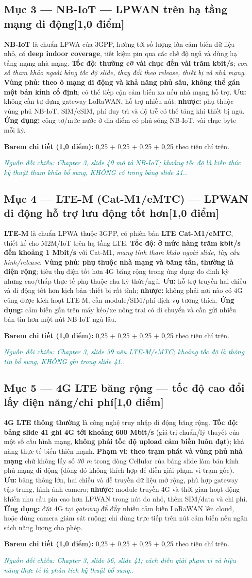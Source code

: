 \documentclass[11pt,a4paper]{article}
\newcommand{\pointpart}[2]{\subsection*{Mục #1 --- #2\hfill\normalsize\color{teal}[1,0 điểm]}}
\newcommand{\src}[1]{\par\noindent\textcolor{teal}{\footnotesize\textit{Nguồn đối chiếu: #1.}}\par}
\newcommand{\scoring}[1]{\par\noindent\textbf{Barem chi tiết (1,0 điểm):} #1\par}
\newcommand{\kw}[1]{\textbf{#1}}
\begin{document}
\pointpart{3}{NB-IoT --- LPWAN trên hạ tầng mạng di động}
\kw{NB-IoT} là chuẩn LPWA của 3GPP, hướng tới số lượng lớn cảm biến dữ liệu nhỏ, có \kw{deep indoor coverage}, tiết kiệm pin qua các chế độ ngủ và dùng hạ tầng mạng nhà mạng. \kw{Tốc độ: thường cỡ vài chục đến vài trăm kbit/s}; \emph{con số tham khảo ngoài bảng tốc độ slide, thay đổi theo release, thiết bị và nhà mạng}. \kw{Vùng phủ: theo ô mạng di động và khả năng phủ sâu, không thể gán một bán kính cố định}; có thể tiếp cận cảm biến xa nếu nhà mạng hỗ trợ. \kw{Ưu:} không cần tự dựng gateway LoRaWAN, hỗ trợ nhiều nút; \kw{nhược:} phụ thuộc vùng phủ NB-IoT, SIM/eSIM, phí duy trì và độ trễ có thể tăng khi thiết bị ngủ. \kw{Ứng dụng:} công tơ/mức nước ở địa điểm có phủ sóng NB-IoT, vài chục byte mỗi kỳ.
\scoring{0,25 + 0,25 + 0,25 + 0,25 theo tiêu chí trên.}
\src{Chapter 3, slide 40 mô tả NB-IoT; khoảng tốc độ là kiến thức kỹ thuật tham khảo bổ sung, KHÔNG có trong bảng slide 41.}

\pointpart{4}{LTE-M (Cat-M1/eMTC) --- LPWAN di động hỗ trợ lưu động tốt hơn}
\kw{LTE-M} là chuẩn LPWA thuộc 3GPP, có phiên bản \kw{LTE Cat-M1/eMTC}, thiết kế cho M2M/IoT trên hạ tầng LTE. \kw{Tốc độ: ở mức hàng trăm kbit/s đến khoảng 1 Mbit/s} với Cat-M1, \emph{mang tính tham khảo ngoài slide, tùy cấu hình/release}. \kw{Vùng phủ: phụ thuộc nhà mạng và băng tần, thường là diện rộng}; tiêu thụ điện tốt hơn 4G băng rộng trong ứng dụng đo định kỳ nhưng cao/thấp thực tế phụ thuộc chu kỳ thức/ngủ. \kw{Ưu:} hỗ trợ truyền hai chiều và di động tốt hơn kịch bản thiết bị rất tĩnh; \kw{nhược:} không phải nơi nào có 4G cũng được kích hoạt LTE-M, cần module/SIM/phí dịch vụ tương thích. \kw{Ứng dụng:} cảm biến gắn trên máy kéo/xe nông trại có di chuyển và cần gửi nhiều bản tin hơn một nút NB-IoT ngủ lâu.
\scoring{0,25 + 0,25 + 0,25 + 0,25 theo tiêu chí trên.}
\src{Chapter 3, slide 39 nêu LTE-M/eMTC; khoảng tốc độ là thông tin bổ sung, KHÔNG ghi trong slide 41.}

\pointpart{5}{4G LTE băng rộng --- tốc độ cao đổi lấy điện năng/chi phí}
\kw{4G LTE thông thường} là công nghệ truy nhập di động băng rộng. \kw{Tốc độ: bảng slide 41 ghi 4G tới khoảng 600 Mbit/s} (giá trị chuẩn/lý thuyết của một số cấu hình mạng, \kw{không phải tốc độ upload cảm biến luôn đạt}); khả năng thực tế biến thiên mạnh. \kw{Phạm vi: theo trạm phát và vùng phủ nhà mạng} chứ không lấy số \emph{30 m} trong dòng Cellular của bảng slide làm bán kính phủ mạng di động (dòng đó không thích hợp để diễn giải phạm vi trạm gốc). \kw{Ưu:} băng thông lớn, hai chiều và dễ truyền dữ liệu mở rộng, phù hợp gateway tập trung, hình ảnh camera; \kw{nhược:} module truyền 4G và thời gian hoạt động khiến nhu cầu pin cao hơn LPWAN trong nút đo nhỏ, thêm SIM/data và chi phí. \kw{Ứng dụng:} đặt 4G tại \emph{gateway} để đẩy nhiều cảm biến LoRaWAN lên cloud, hoặc dùng camera giám sát ruộng; chỉ dùng trực tiếp trên nút cảm biến nếu ngân sách năng lượng cho phép.
\scoring{0,25 + 0,25 + 0,25 + 0,25 theo tiêu chí trên.}
\src{Chapter 3, slide 36, slide 41; cách diễn giải phạm vi và hiệu năng thực tế là phân tích kỹ thuật bổ sung.}
\end{document}
